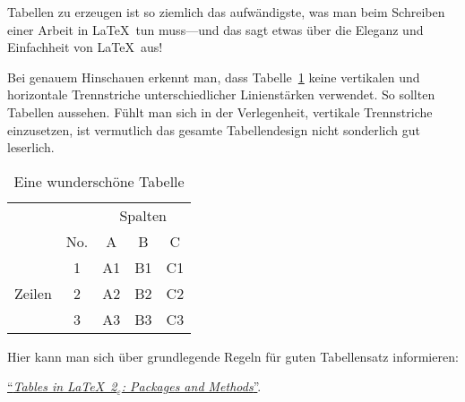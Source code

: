 Tabellen zu erzeugen ist so ziemlich das aufwändigste, was man beim Schreiben einer Arbeit 
in \LaTeX\ tun muss---und das sagt etwas über die Eleganz und Einfachheit von \LaTeX \ aus!

Bei genauem Hinschauen erkennt man, dass Tabelle~\ref{t:table} keine vertikalen und horizontale Trennstriche unterschiedlicher Linienstärken verwendet.
So sollten Tabellen aussehen. Fühlt man sich in der Verlegenheit, vertikale Trennstriche einzusetzen, ist vermutlich das gesamte
Tabellendesign nicht sonderlich gut leserlich.

\begin{table}
	\caption{Eine wunderschöne Tabelle}
	\label{t:table}
	\begin{center}
	\begin{tabular}{ccccc}
	\toprule
                          	&        & \multicolumn{3}{c}{Spalten} \\
    \cmidrule{3-5}
                            & No.    & A     & B     & C           \\
    \midrule
	\multirow{3}{*}{Zeilen} & 1      & A1    & B1    & C1          \\
	                        & 2      & A2    & B2    & C2          \\
	                        & 3      & A3    & B3    & C3          \\
	\bottomrule
	\end{tabular}
	\end{center}
\end{table}

Hier kann man sich über grundlegende Regeln für guten Tabellensatz informieren:

\href{http://tug.org/pracjourn/2007-1/mori/mori.pdf}{``\textit{Tables in \LaTeX\ 2${}_\varepsilon$: Packages and Methods}''}.
